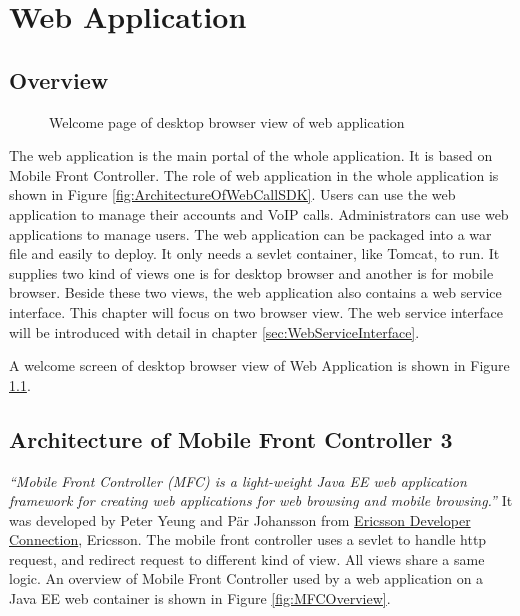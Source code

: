 
\chapter{Web Application}
\label{sec:WebApplication}

\section{Overview}
\label{sec:WebApplication:Overview}

\begin{figure}[!hbtp]
\centering
{}
\caption{Welcome page of desktop browser view of web application}
\label{fig:WelcomePageOfDesktopBrowserView}
\end{figure}

The web application is the main portal of the whole application. It is based on Mobile Front Controller. The role of web application in the whole application is shown in Figure \ref{fig:ArchitectureOfWebCallSDK}. Users can use the web application to manage their accounts and VoIP calls. Administrators can use web applications to manage users. The web application can be packaged into a war file and easily to deploy. It only needs a sevlet container, like Tomcat, to run. It supplies two kind of views one is for desktop browser and another is for mobile browser. Beside these two views, the web application also contains a web service interface. This chapter will focus on two browser view. The web service interface will be introduced with detail in chapter \ref{sec:WebServiceInterface}.

A welcome screen of desktop browser view of Web Application is shown in Figure \ref{fig:WelcomePageOfDesktopBrowserView}.

\section{Architecture of Mobile Front Controller 3}
\label{sec:WebApplication:ArchitectureOfMobileFrontController3}

\textit{``Mobile Front Controller (MFC)\label{sym:MFC} is a light-weight Java EE web application framework for creating web applications for web browsing and mobile browsing.''}\cite{MobileFrontController} It was developed by Peter Yeung and P\"{a}r Johansson from \href{http://www.ericsson.com/developer/}{Ericsson Developer Connection}, Ericsson\cite{MobileFrontController}. The mobile front controller uses a sevlet to handle http request, and redirect request to different kind of view. All views share a same logic. An overview of Mobile Front Controller used by a web application on a Java EE web container is shown in Figure \ref{fig:MFCOverview}.

